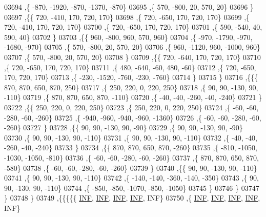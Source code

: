 \begin{DoxyCode}
03694     ,\{  -870, -1920,  -870, -1370,  -870\}
03695     ,\{   570,  -800,    20,   570,    20\}
03696     \}
03697    ,\{\{   720,  -410,   170,   720,   170\}
03698     ,\{   720,  -650,   170,   720,   170\}
03699     ,\{   720,  -410,   170,   720,   170\}
03700     ,\{   720,  -650,   170,   720,   170\}
03701     ,\{   590,  -540,    40,   590,    40\}
03702     \}
03703    ,\{\{   960,  -800,   960,   570,   960\}
03704     ,\{  -970, -1790,  -970, -1680,  -970\}
03705     ,\{   570,  -800,    20,   570,    20\}
03706     ,\{   960, -1120,   960, -1000,   960\}
03707     ,\{   570,  -800,    20,   570,    20\}
03708     \}
03709    ,\{\{   720,  -640,   170,   720,   170\}
03710     ,\{   720,  -650,   170,   720,   170\}
03711     ,\{   480,  -640,   -60,   480,   -60\}
03712     ,\{   720,  -650,   170,   720,   170\}
03713     ,\{  -230, -1520,  -760,  -230,  -760\}
03714     \}
03715    \}
03716   ,\{\{\{   870,   870,   650,   870,   250\}
03717     ,\{   250,   220,     0,   220,   250\}
03718     ,\{    90,    90,  -130,    90,  -110\}
03719     ,\{   870,   870,   650,   870,  -110\}
03720     ,\{   -40,   -40,  -260,   -40,  -240\}
03721     \}
03722    ,\{\{   250,   220,     0,   220,   250\}
03723     ,\{   250,   220,     0,   220,   250\}
03724     ,\{   -60,   -60,  -280,   -60,  -260\}
03725     ,\{  -940,  -960,  -940,  -960, -1360\}
03726     ,\{   -60,   -60,  -280,   -60,  -260\}
03727     \}
03728    ,\{\{    90,    90,  -130,    90,   -90\}
03729     ,\{    90,    90,  -130,    90,   -90\}
03730     ,\{    90,    90,  -130,    90,  -110\}
03731     ,\{    90,    90,  -130,    90,  -110\}
03732     ,\{   -40,   -40,  -260,   -40,  -240\}
03733     \}
03734    ,\{\{   870,   870,   650,   870,  -260\}
03735     ,\{  -810, -1050, -1030, -1050,  -810\}
03736     ,\{   -60,   -60,  -280,   -60,  -260\}
03737     ,\{   870,   870,   650,   870,  -580\}
03738     ,\{   -60,   -60,  -280,   -60,  -260\}
03739     \}
03740    ,\{\{    90,    90,  -130,    90,  -110\}
03741     ,\{    90,    90,  -130,    90,  -110\}
03742     ,\{  -140,  -140,  -360,  -140,  -350\}
03743     ,\{    90,    90,  -130,    90,  -110\}
03744     ,\{  -850,  -850, -1070,  -850, -1050\}
03745     \}
03746    \}
03747   \}
03748  \}
03749 ,\{\{\{\{\{   \hyperlink{energy__const_8h_a12c2040f25d8e3a7b9e1c2024c618cb6}{INF},   \hyperlink{energy__const_8h_a12c2040f25d8e3a7b9e1c2024c618cb6}{INF},   \hyperlink{energy__const_8h_a12c2040f25d8e3a7b9e1c2024c618cb6}{INF},   \hyperlink{energy__const_8h_a12c2040f25d8e3a7b9e1c2024c618cb6}{INF},   INF\}
03750     ,\{   \hyperlink{energy__const_8h_a12c2040f25d8e3a7b9e1c2024c618cb6}{INF},   \hyperlink{energy__const_8h_a12c2040f25d8e3a7b9e1c2024c618cb6}{INF},   \hyperlink{energy__const_8h_a12c2040f25d8e3a7b9e1c2024c618cb6}{INF},   \hyperlink{energy__const_8h_a12c2040f25d8e3a7b9e1c2024c618cb6}{INF},   INF\}

\end{DoxyCode}
